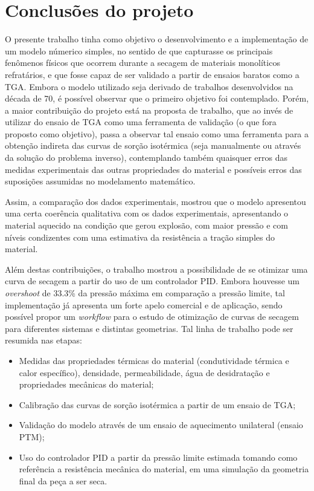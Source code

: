 \section{Conclusões do projeto}
O presente trabalho tinha como objetivo o desenvolvimento e a implementação de
um modelo númerico simples, no sentido de que capturasse os principais fenômenos
físicos que ocorrem durante a secagem de materiais monolíticos refratários, e
que fosse capaz de ser validado a partir de ensaios baratos como a TGA. Embora
o modelo utilizado seja derivado de trabalhos desenvolvidos na década de 70, é
possível observar que o primeiro objetivo foi contemplado. Porém, a
maior contribuição do projeto está na proposta de trabalho, que ao invés de
utilizar do ensaio de TGA como uma ferramenta de validação (o que fora proposto
como objetivo), passa a observar tal ensaio como uma ferramenta para a obtenção
indireta das curvas de sorção isotérmica (seja manualmente ou através da solução do
problema inverso), contemplando também quaisquer erros das medidas experimentais
das outras propriedades do material e possíveis erros das suposições assumidas
no modelamento matemático.

Assim, a comparação dos dados experimentais, mostrou que o modelo apresentou uma
certa coerência qualitativa com os dados experimentais, apresentando o material
aquecido na condição que gerou explosão, com
maior pressão e com níveis condizentes com uma estimativa da resistência a
tração simples do material.

Além destas contribuições, o trabalho mostrou a possibilidade de se otimizar uma
curva de secagem a partir do uso de um controlador PID. Embora houvesse um {\it
  overshoot} de 33.3\% da pressão máxima em comparação a pressão limite, tal
implementação já apresenta um forte apelo comercial e de aplicação, sendo
possível propor um {\it workflow} para o estudo de otimização de curvas de
secagem para diferentes sistemas e distintas geometrias. Tal linha de trabalho
pode ser resumida nas etapas:

\begin{itemize}
  \item Medidas das propriedades térmicas do material (condutividade térmica e
    calor específico), densidade, permeabilidade, água de desidratação e
    propriedades mecânicas do material;
  \item Calibração das curvas de sorção isotérmica a partir de um ensaio de TGA;
  \item Validação do modelo através de um ensaio de aquecimento unilateral
    (ensaio PTM);
  \item Uso do controlador PID a partir da pressão limite estimada tomando como
    referência a resistência mecânica do material, em uma simulação da geometria
    final da peça a ser seca.
\end{itemize}

